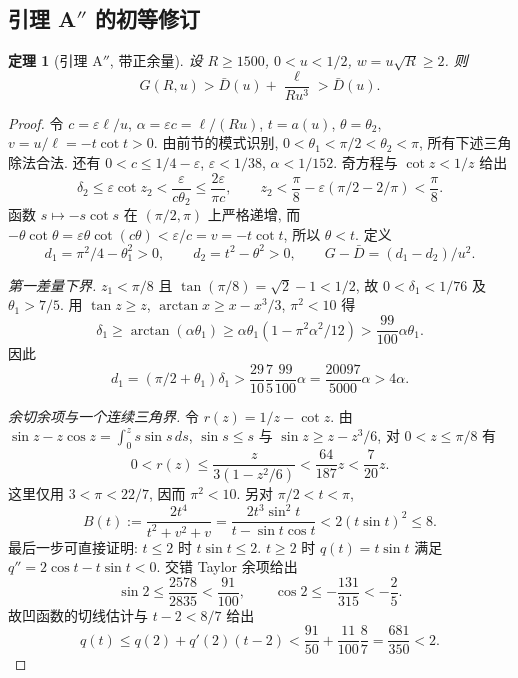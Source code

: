 \documentclass[UTF8]{ctexart}
\newtheorem{theorem}{定理}[section]
\begin{document}
\subsection{引理 A\texorpdfstring{$''$}{} 的初等修订}\label{sec:lemAdp}
\begin{theorem}[引理 A$''$, 带正余量]\label{thm:lemAdp}
设 $R\ge1500$, $0<u<1/2$, $w=u\sqrt R\ge2$. 则
\begin{equation}
 G(R,u)>\bar D(u)+\frac{\ell}{Ru^3}>\bar D(u).
\end{equation}
\end{theorem}
\begin{proof}
令 $c=\varepsilon\ell/u$, $\alpha=\varepsilon c=\ell/(Ru)$,
$t=a(u)$, $\theta=\theta_2$, $v=u/\ell=-t\cot t>0$.
由前节的模式识别, $0<\theta_1<\pi/2<\theta_2<\pi$, 所有下述三角除法合法.
还有 $0<c\le1/4-\varepsilon$, $\varepsilon<1/38$, $\alpha<1/152$.
奇方程与 $\cot z<1/z$ 给出
\[
 \delta_2\le\varepsilon\cot z_2<\frac{\varepsilon}{c\theta_2}
 \le\frac{2\varepsilon}{\pi c},\qquad
 z_2<\frac\pi8-\varepsilon(\pi/2-2/\pi)<\frac\pi8.
\]
函数 $s\mapsto-s\cot s$ 在 $(\pi/2,\pi)$ 上严格递增, 而
$-\theta\cot\theta=\varepsilon\theta\cot(c\theta)<\varepsilon/c=v=-t\cot t$,
所以 $\theta<t$. 定义
\[
 d_1=\pi^2/4-\theta_1^2>0,\qquad d_2=t^2-\theta^2>0,\qquad
 G-\bar D=(d_1-d_2)/u^2.
\]

\emph{第一差量下界.} $z_1<\pi/8$ 且 $\tan(\pi/8)=\sqrt2-1<1/2$,
故 $0<\delta_1<1/76$ 及 $\theta_1>7/5$.
用 $\tan z\ge z$, $\arctan x\ge x-x^3/3$, $\pi^2<10$ 得
\[
 \delta_1\ge\arctan(\alpha\theta_1)
 \ge\alpha\theta_1(1-\pi^2\alpha^2/12)
 >\frac{99}{100}\alpha\theta_1.
\]
因此
\begin{equation}
 d_1=(\pi/2+\theta_1)\delta_1
 >\frac{29}{10}\frac75\frac{99}{100}\alpha
 =\frac{20097}{5000}\alpha>4\alpha.\label{eq:r8-def1}
\end{equation}

\emph{余切余项与一个连续三角界.} 令 $r(z)=1/z-\cot z$.
由 $\sin z-z\cos z=\int_0^z s\sin s\,ds$,
$\sin s\le s$ 与 $\sin z\ge z-z^3/6$, 对 $0<z\le\pi/8$ 有
\begin{equation}
 0<r(z)\le\frac{z}{3(1-z^2/6)}
 <\frac{64}{187}z<\frac7{20}z.\label{eq:r8-cot-elementary}
\end{equation}
这里仅用 $3<\pi<22/7$, 因而 $\pi^2<10$.
另对 $\pi/2<t<\pi$,
\begin{equation}
 B(t):=\frac{2t^4}{t^2+v^2+v}
 =\frac{2t^3\sin^2t}{t-\sin t\cos t}<2(t\sin t)^2\le8.\label{eq:r8-B8}
\end{equation}
最后一步可直接证明: $t\le2$ 时 $t\sin t\le2$.
$t\ge2$ 时 $q(t)=t\sin t$ 满足 $q''=2\cos t-t\sin t<0$.
交错 Taylor 余项给出
\[
 \sin2\le\frac{2578}{2835}<\frac{91}{100},\qquad
 \cos2\le-\frac{131}{315}<-\frac25.
\]
故凹函数的切线估计与 $t-2<8/7$ 给出
\[
 q(t)\le q(2)+q'(2)(t-2)
 <\frac{91}{50}+\frac{11}{100}\frac87
 =\frac{681}{350}<2.
\]


\end{proof}
\end{document}
